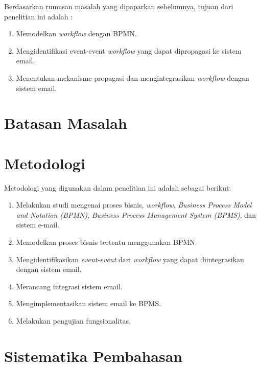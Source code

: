 Berdasarkan rumusan masalah yang dipaparkan sebelumnya, tujuan dari penelitian ini adalah :
\begin{enumerate}
	\item Memodelkan \textit{workflow} dengan BPMN.
	\item Mengidentifikasi event-event \textit{workflow} yang dapat dipropagasi ke sistem email.
	\item Menentukan mekanisme propagasi dan mengintegrasikan \textit{workflow} dengan sistem email.
\end{enumerate}




\section{Batasan Masalah}
\label{sec:batasan}




\section{Metodologi}
\label{sec:metlit}

Metodologi yang digunakan dalam penelitian ini adalah sebagai berikut:
\begin{enumerate}
	\item Melakukan studi mengenai proses bisnis, \textit{workflow}, \textit{Business Process Model and Notation (BPMN)}, \textit{Business Process Management System (BPMS)}, dan sistem e-mail. 
	\item Memodelkan proses bisnis tertentu menggunakan BPMN.
	\item Mengidentifikasikan \textit{event-event} dari \textit{workflow} yang dapat diintegrasikan dengan sistem email.
	\item Merancang integrasi sistem email.
	\item Mengimplementasikan sistem email ke BPMS.
	\item Melakukan pengujian fungsionalitas.
\end{enumerate}




\section{Sistematika Pembahasan}
\label{sec:sispem}

